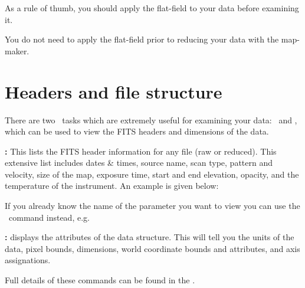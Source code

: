 As a rule of thumb, you should apply the flat-field to your data
before examining it.


\begin{tip}
You do not need to apply the flat-field prior to reducing your
data with the map-maker.
\end{tip}

\section{Headers and file structure}
\label{sec:fitsheader}

There are two \Kappa\ tasks which are extremely useful for examining
your data: \fitslist\ and \ndftrace, which can be used to view the
FITS headers and dimensions of the data.


\begin{aligndesc}
\item[\textbf{\task{fitslist}:}] This lists the FITS header
  information for any file (raw or reduced). This extensive list
  includes dates \& times, source name, scan type, pattern and
  velocity, size of the map, exposure time, start and end elevation,
  opacity, and the temperature of the instrument. An example is given
  below:
\begin{terminalv}
\end{terminalv}

If you already know the name of the parameter you want to view you can
use the \fitsval\ command instead, e.g.%
\begin{terminalv}
\end{terminalv}

\item[\textbf{\task{ndftrace}:}]  displays the
  attributes of the data structure. This will tell you the units of
  the data, pixel bounds, dimensions, world coordinate bounds and
  attributes, and axis assignations.
\begin{terminalv}
\end{terminalv}

\end{aligndesc}


Full details of these commands can be found in the
.

